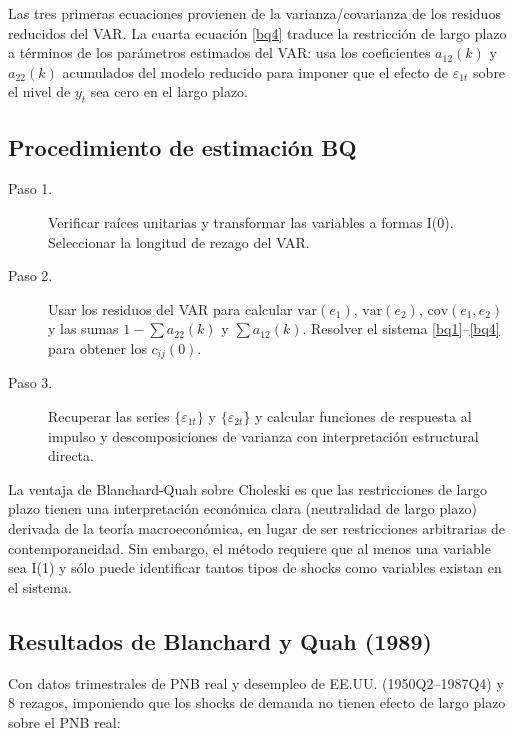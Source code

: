 \documentclass[12pt]{article}
\begin{document}
\begin{intuicionmat}
Las tres primeras ecuaciones provienen de la varianza/covarianza de los residuos reducidos del VAR. La cuarta ecuaci\'on \eqref{bq4} traduce la restricci\'on de largo plazo a t\'erminos de los par\'ametros estimados del VAR: usa los coeficientes $a_{12}(k)$ y $a_{22}(k)$ acumulados del modelo reducido para imponer que el efecto de $\varepsilon_{1t}$ sobre el nivel de $y_t$ sea cero en el largo plazo.
\end{intuicionmat}

\subsection{Procedimiento de estimaci\'on BQ}

\begin{description}
  \item[Paso 1.] Verificar ra\'ices unitarias y transformar las variables a formas I(0). Seleccionar la longitud de rezago del VAR.
  \item[Paso 2.] Usar los residuos del VAR para calcular $\text{var}(e_1)$, $\text{var}(e_2)$, $\text{cov}(e_1,e_2)$ y las sumas $1-\sum a_{22}(k)$ y $\sum a_{12}(k)$. Resolver el sistema \eqref{bq1}--\eqref{bq4} para obtener los $c_{ij}(0)$.
  \item[Paso 3.] Recuperar las series $\{\varepsilon_{1t}\}$ y $\{\varepsilon_{2t}\}$ y calcular funciones de respuesta al impulso y descomposiciones de varianza con interpretaci\'on estructural directa.
\end{description}

\begin{intuicion}
La ventaja de Blanchard-Quah sobre Choleski es que las restricciones de largo plazo tienen una interpretaci\'on econ\'omica clara (neutralidad de largo plazo) derivada de la teor\'ia macroecon\'omica, en lugar de ser restricciones arbitrarias de contemporaneidad. Sin embargo, el m\'etodo requiere que al menos una variable sea I(1) y s\'olo puede identificar tantos tipos de shocks como variables existan en el sistema.
\end{intuicion}

\subsection{Resultados de Blanchard y Quah (1989)}

Con datos trimestrales de PNB real y desempleo de EE.UU. (1950Q2--1987Q4) y 8 rezagos, imponiendo que los shocks de demanda no tienen efecto de largo plazo sobre el PNB real:
\end{document}
